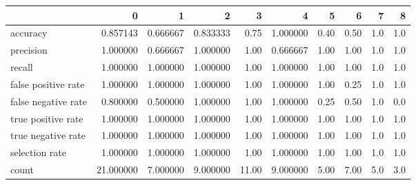 \begin{tabular}{lrrrrrrrrr}
\toprule
{} &          0 &         1 &         2 &      3 &         4 &     5 &     6 &    7 &    8 \\
\midrule
accuracy            &   0.857143 &  0.666667 &  0.833333 &   0.75 &  1.000000 &  0.40 &  0.50 &  1.0 &  1.0 \\
precision           &   1.000000 &  0.666667 &  1.000000 &   1.00 &  0.666667 &  1.00 &  1.00 &  1.0 &  1.0 \\
recall              &   1.000000 &  1.000000 &  1.000000 &   1.00 &  1.000000 &  1.00 &  1.00 &  1.0 &  1.0 \\
false positive rate &   1.000000 &  1.000000 &  1.000000 &   1.00 &  1.000000 &  1.00 &  0.25 &  1.0 &  1.0 \\
false negative rate &   0.800000 &  0.500000 &  1.000000 &   1.00 &  1.000000 &  0.25 &  0.50 &  1.0 &  0.0 \\
true positive rate  &   1.000000 &  1.000000 &  1.000000 &   1.00 &  1.000000 &  1.00 &  1.00 &  1.0 &  1.0 \\
true negative rate  &   1.000000 &  1.000000 &  1.000000 &   1.00 &  1.000000 &  1.00 &  1.00 &  1.0 &  1.0 \\
selection rate      &   1.000000 &  1.000000 &  1.000000 &   1.00 &  1.000000 &  1.00 &  1.00 &  1.0 &  1.0 \\
count               &  21.000000 &  7.000000 &  9.000000 &  11.00 &  9.000000 &  5.00 &  7.00 &  5.0 &  3.0 \\
\bottomrule
\end{tabular}

